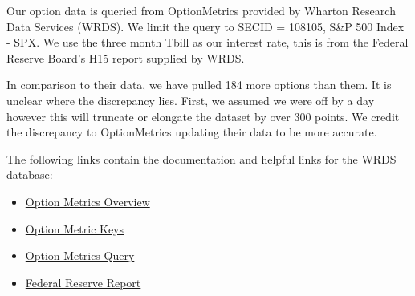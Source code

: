 Our option data is queried from OptionMetrics provided by Wharton Research Data Services (WRDS). We limit the query to SECID = 108105, S\&P 500 Index - SPX. We use the three month Tbill as our interest rate, this is from the Federal Reserve Board's H15 report supplied by WRDS. 

In comparison to their data, we have pulled 184 more options than them. It is unclear where the discrepancy lies. First, we assumed we were off by a day however this will truncate or elongate the dataset by over 300 points. We credit the discrepancy to OptionMetrics updating their data to be more accurate. 

The following links contain the documentation and helpful links for the WRDS database: 
\begin{itemize}
\item \href{https://wrds-www.wharton.upenn.edu/pages/support/manuals-and-overviews/optionmetrics/wrds-overview-optionmetrics/}{Option Metrics Overview} 
\item \href{https://wrds-www.wharton.upenn.edu/data-dictionary/optionm_all/opprcd2023/ }{Option Metric Keys}
\item \href{https://wrds-www.wharton.upenn.edu/pages/get-data/optionmetrics/ivy-db-us/options/option-prices/}{Option Metrics Query} 
\item \href{https://wrds-www.wharton.upenn.edu/data-dictionary/frb_all/rates_daily/}{Federal Reserve Report} 
\end{itemize}



\newpage

% 

%
%
%
%
%
%
%
%
